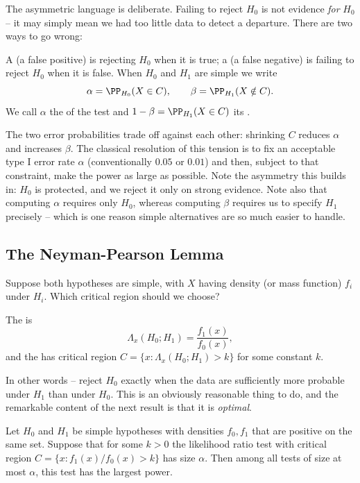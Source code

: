 The asymmetric language is deliberate. Failing to reject $H_0$ is not evidence \emph{for} $H_0$ -- it may simply mean we had too little data to detect a departure. There are two ways to go wrong:

\begin{definition}
  A  (a false positive) is rejecting $H_0$ when it is true; a  (a false negative) is failing to reject $H_0$ when it is false. When $H_0$ and $H_1$ are simple we write
  $$
  \alpha = \PP_{H_0}(X \in C), \qquad \beta = \PP_{H_1}(X \notin C).
  $$
  We call $\alpha$ the  of the test and $1 - \beta = \PP_{H_1}(X \in C)$ its .
\end{definition}

The two error probabilities trade off against each other: shrinking $C$ reduces $\alpha$ and increases $\beta$. The classical resolution of this tension is to fix an acceptable type I error rate $\alpha$ (conventionally $0.05$ or $0.01$) and then, subject to that constraint, make the power as large as possible. Note the asymmetry this builds in: $H_0$ is protected, and we reject it only on strong evidence. Note also that computing $\alpha$ requires only $H_0$, whereas computing $\beta$ requires us to specify $H_1$ precisely -- which is one reason simple alternatives are so much easier to handle.

\subsection{The Neyman-Pearson Lemma}

Suppose both hypotheses are simple, with $X$ having density (or mass function) $f_i$ under $H_i$. Which critical region should we choose?

\begin{definition}
  The  is
  $$
  \Lambda_x(H_0; H_1) = \frac{f_1(x)}{f_0(x)},
  $$
  and the  has critical region $C = \{x : \Lambda_x(H_0;H_1) > k\}$ for some constant $k$.
\end{definition}

In other words -- reject $H_0$ exactly when the data are sufficiently more probable under $H_1$ than under $H_0$. This is an obviously reasonable thing to do, and the remarkable content of the next result is that it is \emph{optimal}.

\begin{lemma}
  Let $H_0$ and $H_1$ be simple hypotheses with densities $f_0, f_1$ that are positive on the same set. Suppose that for some $k > 0$ the likelihood ratio test with critical region $C = \{x : f_1(x)/f_0(x) > k\}$ has size $\alpha$. Then among all tests of size at most $\alpha$, this test has the largest power.
\end{lemma}

